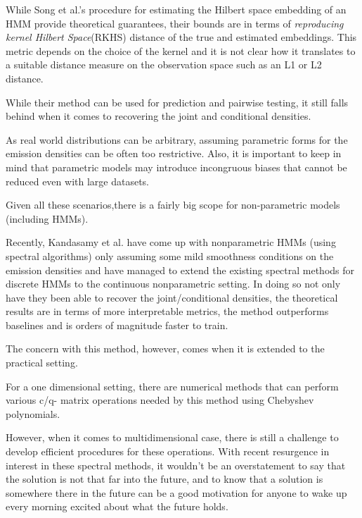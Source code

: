 While Song et al.'s \cite{ref20} procedure for estimating the Hilbert space embedding of an HMM provide theoretical guarantees, their bounds are in terms of \textit{reproducing kernel Hilbert Space}(RKHS) distance of the true and estimated embeddings. This metric depends on the choice of the kernel and it is not clear how it translates to a suitable distance measure on the observation space such as an L1 or L2 distance\cite{ref27}.

While their method can be used for prediction and pairwise testing, it still falls behind when it comes to recovering the joint and conditional densities. 



As real world distributions can be arbitrary, assuming parametric forms for the emission densities can be often too restrictive. Also, it is important to keep in mind that parametric models may introduce incongruous biases that cannot be reduced even with large datasets. 

Given all these scenarios,there is a fairly big scope for non-parametric models (including HMMs).

Recently, Kandasamy et al. \cite{ref27} have come up with nonparametric HMMs (using spectral algorithms) only assuming some mild smoothness conditions on the emission densities and have managed to extend the existing spectral methods for discrete HMMs to the continuous nonparametric setting. In doing so not only have they been able to recover the
joint/conditional densities, the theoretical results are in terms of more interpretable metrics, the
method outperforms baselines and is orders of magnitude faster to train.

The concern with this method, however, comes when it is extended to the practical setting.

For a one dimensional setting, there are numerical methods that can perform various c/q- matrix operations needed by this method using Chebyshev polynomials.

However, when it comes to multidimensional case, there is still a challenge to develop efficient procedures for these operations. 
With recent resurgence in interest in these spectral methods, it wouldn't be an overstatement to say that the solution is not that far into the future, and to know that a solution is somewhere there in the future can be a good motivation for anyone to wake up every morning excited about what the future holds. 



